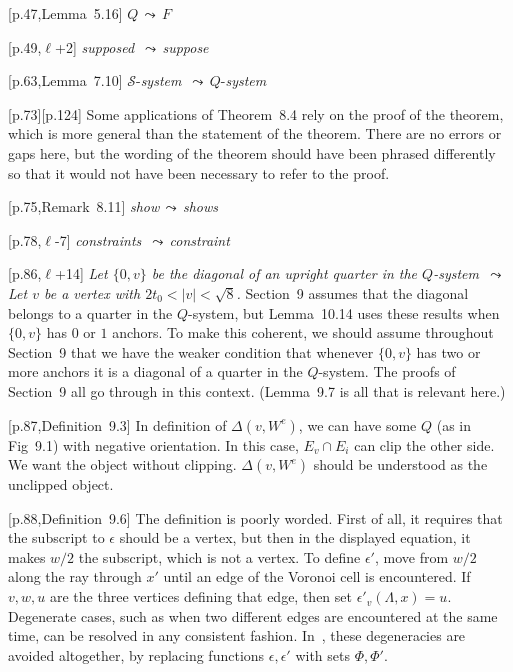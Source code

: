 \documentclass[11pt]{amsart}
\def\lto{\ensuremath{\,\leadsto\,}}
\def\line{$\ell$}
\def\sz{small} %
\def\rmx{\rm}
\begin{document}
\begin{\sz}
\baselineskip

[p.47,Lemma~5.16] $Q\lto F$

[p.49,\line+2] {\it supposed} \lto {\it suppose}
	
[p.63,Lemma~7.10]
	${\mathcal S}$-{\it system} \lto $Q$-{\it system}
	
[p.73][p.124] {\rmx Some applications of Theorem~8.4 rely on
the proof of the theorem, which is more general than
the statement of the theorem.  There are no errors or gaps here,
but the wording of the theorem should have been phrased differently
so that it would not have been necessary to refer to the proof.}

[p.75,Remark~8.11]
	{\it show}\lto {\it shows}

[p.78,\line-7] {\it constraints} \lto{\it  constraint}

[p.86,\line+14] {\it Let $\{0,v\}$ be 
          the diagonal of an upright quarter in the $Q$-system
        \lto
       Let $v$ be a vertex with $2t_0<|v|<\sqrt8$.}
           {\rmx Section~9 assumes that the diagonal belongs to
          a quarter in the $Q$-system, but Lemma~10.14 uses these
          results when $\{0,v\}$ has $0$ or $1$ anchors.  To make
          this coherent, we should assume throughout Section~9 that
          we have the weaker condition that whenever $\{0,v\}$ has
          two or more anchors it is a diagonal of a quarter in the $Q$-system.
          The proofs of Section~9 all go through in this context.
           (Lemma~9.7 is all that is relevant here.)}

[p.87,Definition~9.3]
	{\rmx In definition of $\Delta(v,W^e)$, we
	can have some $Q$ (as in Fig~9.1)
	with negative orientation.
	In this case, $E_v\cap E_i$ can clip
	the other side.  We want the object
	without clipping.   $\Delta(v,W^e)$ should be understood as the
        unclipped object.}
	
[p.88,Definition~9.6]
	{\rmx The definition is poorly worded.  First of
	all, it requires that the subscript to
	$\epsilon$ should be a vertex, but then in
	the displayed equation, it makes $w/2$ the
	subscript, which is not a vertex.   To
	define $\epsilon'$, move from $w/2$ along
	the ray through $x'$ until an edge of the
	Voronoi cell is encountered.  If $v,w,u$
	are the three vertices defining that edge,
	then set $\epsilon'_v(\Lambda,x)=u$.
	Degenerate cases, such as when two different
	edges are encountered at the same time,
	can be resolved in any consistent fashion.  In~\cite{hales:2008:collection},
      these degeneracies are avoided altogether, by replacing functions 
      $\epsilon,\epsilon'$ with sets $\Phi,\Phi'$.
     }
	

\end{\sz}
\end{document}
